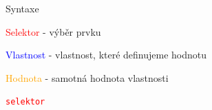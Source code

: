 \documentclass[aspectratio=169]{beamer}
\begin{document}
\begin{frame}{Syntaxe}
    \begin{cardTiny}
        \begin{flushleft}
            \textcolor{red}{Selektor} - výběr prvku

            \textcolor{blue}{Vlastnost} - vlastnost, které definujeme hodnotu

            \textcolor{orange}{Hodnota} - samotná hodnota vlastnosti
        \end{flushleft}
    \end{cardTiny}

    \begin{cardTiny}
        \begin{alltt}
            \textcolor{red}{selektor} \string{\\
            \textcolor{blue}{vlastnost}: \textcolor{orange}{hodnota};\\
            \string}
        \end{alltt}
    \end{cardTiny}
\end{frame}
\end{document}
